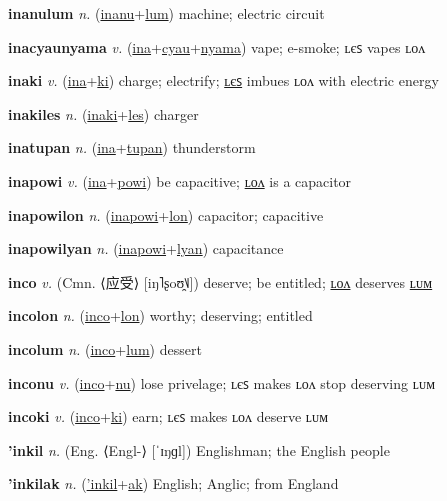 \textbf{\hypertarget{inanulum}{inanulum}} \textit{n.} (\hyperlink{inanu}{inanu}+\allowbreak \hyperlink{lum}{lum})
machine; electric circuit

\textbf{\hypertarget{inacyaunyama}{inacyaunyama}} \textit{v.} (\hyperlink{ina}{ina}+\allowbreak \hyperlink{cyau}{cyau}+\allowbreak \hyperlink{nyama}{nyama})
vape; e-smoke; ʟєꜱ vapes ʟᴏᴧ

\textbf{\hypertarget{inaki}{inaki}} \textit{v.} (\hyperlink{ina}{ina}+\allowbreak \hyperlink{ki}{ki})
charge; electrify; \hyperlink{inakiles}{ʟєꜱ} imbues ʟᴏᴧ with electric energy

\textbf{\hypertarget{inakiles}{inakiles}} \textit{n.} (\hyperlink{inaki}{inaki}+\allowbreak \hyperlink{les}{les})
charger

\textbf{\hypertarget{inatupan}{inatupan}} \textit{n.} (\hyperlink{ina}{ina}+\allowbreak \hyperlink{tupan}{tupan})
thunderstorm

\textbf{\hypertarget{inapowi}{inapowi}} \textit{v.} (\hyperlink{ina}{ina}+\allowbreak \hyperlink{powi}{powi})
be capacitive; \hyperlink{inapowilon}{ʟᴏᴧ} is a capacitor

\textbf{\hypertarget{inapowilon}{inapowilon}} \textit{n.} (\hyperlink{inapowi}{inapowi}+\allowbreak \hyperlink{lon}{lon})
capacitor; capacitive

\textbf{\hypertarget{inapowilyan}{inapowilyan}} \textit{n.} (\hyperlink{inapowi}{inapowi}+\allowbreak \hyperlink{lyan}{lyan})
capacitance

\textbf{\hypertarget{inco}{inco}} \textit{v.} (Cmn. ⟨{\chinese{}应受}⟩ [iŋ˥ʂoʊ̯˥˩])
deserve; be entitled; \hyperlink{incolon}{ʟᴏᴧ} deserves \hyperlink{incolum}{ʟᴜᴍ}

\textbf{\hypertarget{incolon}{incolon}} \textit{n.} (\hyperlink{inco}{inco}+\allowbreak \hyperlink{lon}{lon})
worthy; deserving; entitled

\textbf{\hypertarget{incolum}{incolum}} \textit{n.} (\hyperlink{inco}{inco}+\allowbreak \hyperlink{lum}{lum})
dessert

\textbf{\hypertarget{inconu}{inconu}} \textit{v.} (\hyperlink{inco}{inco}+\allowbreak \hyperlink{nu}{nu})
lose privelage; ʟєꜱ makes ʟᴏᴧ stop deserving ʟᴜᴍ

\textbf{\hypertarget{incoki}{incoki}} \textit{v.} (\hyperlink{inco}{inco}+\allowbreak \hyperlink{ki}{ki})
earn; ʟєꜱ makes ʟᴏᴧ deserve ʟᴜᴍ

\textbf{\hypertarget{'inkil}{'inkil}} \textit{n.} (Eng. ⟨Engl-⟩ [ˈɪŋɡl])
Englishman; the English people

\textbf{\hypertarget{'inkilak}{'inkilak}} \textit{n.} (\hyperlink{'inkil}{'inkil}+\allowbreak \hyperlink{ak}{ak})
English; Anglic; from England

